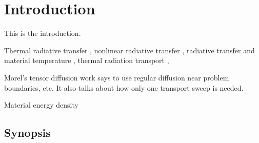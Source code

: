 
\chapter{Introduction}
This is the introduction.

Thermal radiative transfer \cite{Urb2006,McC2008a}, nonlinear radiative transfer
\cite{Den2009}, radiative transfer and material temperature
\cite{Gen2001,Mor2000}, thermal radiation transport \cite{McC2007,Dav2010},

Morel's tensor diffusion work \cite{Mor2007} says to use regular diffusion near
problem boundaries, etc. It also talks about how only one transport sweep is
needed.

Material energy density \cite{Su2001}

\section{Synopsis}
